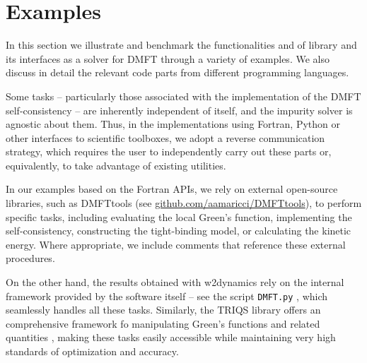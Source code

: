 \documentclass[edipack_sp.tex]{subfiles}
\begin{document}
\section{Examples}\label{SecExamples}
In this section we illustrate and benchmark the functionalities and of  \NAME
library and its interfaces as a solver for DMFT through a variety of examples. We also discuss in detail the relevant code parts from different programming languages. 

Some tasks -- particularly those associated with the implementation of the DMFT self-consistency -- are inherently independent of \NAME itself, and the impurity solver is agnostic about them. 
Thus, in the implementations using Fortran, Python or other \NAME interfaces to scientific toolboxes, we adopt a reverse communication strategy, which requires the user to independently carry out these parts or, equivalently, to take advantage of existing utilities. 

In our examples based on the Fortran APIs, we rely on external open-source libraries, such as DMFTtools (see \href{https://github.com/aamaricci/DMFTtools}{github.com/aamaricci/DMFTtools}), to perform specific tasks, including evaluating the local Green’s function, implementing the self-consistency, constructing the tight-binding model, or calculating the kinetic energy.
Where appropriate, we include comments that reference these external procedures.

On the other hand, the results obtained with w2dynamics rely on the internal framework provided by the software itself -- see the script \texttt{DMFT.py} \cite{Wallerberger2019CPC}, which seamlessly handles all these tasks.
Similarly, the TRIQS library offers an comprehensive framework fo manipulating Green’s functions and related quantities \cite{Parcollet2015CPC}, making these tasks easily accessible while maintaining very high standards of optimization and accuracy.
\end{document}
